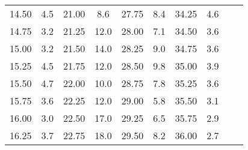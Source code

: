 \begin{table}
\begin{tabular}{S[]S[]S[]S[]S[]S[]S[]S[]S[]S[]}
14.50 & 4.5 & 21.00 &  8.6 & 27.75 &  8.4 & 34.25 & 4.6 &  &  \\
14.75 & 3.2 & 21.25 & 12.0 & 28.00 &  7.1 & 34.50 & 3.6 &  &  \\
15.00 & 3.2 & 21.50 & 14.0 & 28.25 &  9.0 & 34.75 & 3.6 &  &  \\
15.25 & 4.5 & 21.75 & 12.0 & 28.50 &  9.8 & 35.00 & 3.9 &  &  \\
15.50 & 4.7 & 22.00 & 10.0 & 28.75 &  7.8 & 35.25 & 3.6 &  &  \\
15.75 & 3.6 & 22.25 & 12.0 & 29.00 &  5.8 & 35.50 & 3.1 &  &  \\
16.00 & 3.0 & 22.50 & 17.0 & 29.25 &  6.5 & 35.75 & 2.9 &  &  \\
16.25 & 3.7 & 22.75 & 18.0 & 29.50 &  8.2 & 36.00 & 2.7 &  &  \\






























































































\bottomrule
\end{tabular}\end{table}